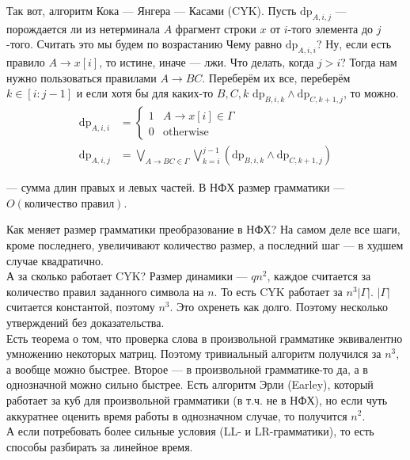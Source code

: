 \documentclass{article}
\begin{document}
\begin{itemize}
\begin{Comment}
            Так вот, алгоритм Кока --- Янгера --- Касами (CYK). Пусть $\mathrm{dp}_{A,i,j}$ --- порождается ли из нетерминала $A$ фрагмент строки $x$ от $i$-того элемента до $j$-того. Считать это мы будем по возрастанию Чему равно $\mathrm{dp}_{A,i,i}$? Ну, если есть правило $A\to x[i]$, то истине, иначе --- лжи. Что делать, когда $j>i$? Тогда нам нужно пользоваться правилами $A\to BC$. Переберём их все, переберём $k\in[i:j-1]$ и если хотя бы для каких-то $B,C,k$ $\mathrm{dp}_{B,i,k}\land\mathrm{dp}_{C,k+1,j}$, то можно.
            \[\begin{split}
                \mathrm{dp}_{A,i,i}&=\begin{cases}
                    1 & A\to x[i]\in\Gamma\\
                    0 & \mathrm{otherwise}
                \end{cases}\\
                \mathrm{dp}_{A,i,j}&=\bigvee\limits_{A\to BC\in\Gamma}\bigvee\limits_{k=i}^{j-1}(\mathrm{dp}_{B,i,k}\land\mathrm{dp}_{C,k+1,j})
            \end{split}\]
        \end{Comment}
        \dfn {} --- сумма длин правых и левых частей.
        \thm В НФХ размер грамматики --- $O(\text{количество правил})$.
        \begin{Comment}
            Как меняет размер грамматики преобразование в НФХ? На самом деле все шаги, кроме последнего, увеличивают количество размер, а последний шаг --- в худшем случае квадратично.\\
            А за сколько работает CYK? Размер динамики --- $qn^2$, каждое считается за количество правил заданного символа на $n$. То есть CYK работает за $n^3|\Gamma|$. $|\Gamma|$ считается константой, поэтому $n^3$. Это охренеть как долго. Поэтому несколько утверждений без доказательства.\\
            Есть теорема о том, что проверка слова в произвольной грамматике эквивалентно умножению некоторых матриц. Поэтому тривиальный алгоритм получился за $n^3$, а вообще можно быстрее. Второе --- в произвольной грамматике-то да, а в однозначной можно сильно быстрее. Есть алгоритм Эрли (Earley), который работает за куб для произвольной грамматики (в т.ч. не в НФХ), но если чуть аккуратнее оценить время работы в однозначном случае, то получится $n^2$.\\
            А если потребовать более сильные условия (LL- и LR-грамматики), то есть способы разбирать за линейное время.

\end{Comment}
\end{itemize}
\end{document}
